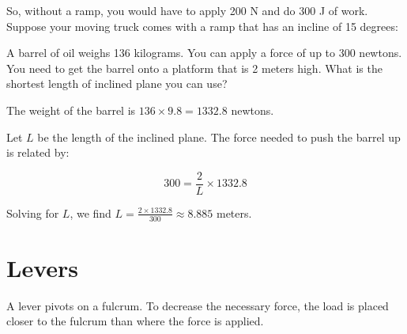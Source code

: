 So, without a ramp, you would have to apply 200 N and do 300 J of work. Suppose 
your moving truck comes with a ramp that has an incline of 15 degrees:

\begin{center}
\end{center}

\begin{Exercise}[title={Ramp}, label=ramp]
A barrel of oil weighs 136 kilograms. You can apply a force of up to 300 newtons. You need to get the barrel onto a platform that is 2 meters high. What is the shortest length of inclined plane you can use?
\end{Exercise}
\begin{Answer}[ref=ramp]
The weight of the barrel is \( 136 \times 9.8 = 1332.8 \) newtons.

Let \( L \) be the length of the inclined plane. The force needed to push the barrel up is related by:

\[
300 = \frac{2}{L} \times 1332.8
\]

Solving for \( L \), we find \( L = \frac{2 \times 1332.8}{300} \approx 8.885 \) meters.
\end{Answer}

\section{Levers}

A lever pivots on a fulcrum. To decrease the necessary force, the load is placed closer to the fulcrum than where the force is applied.

